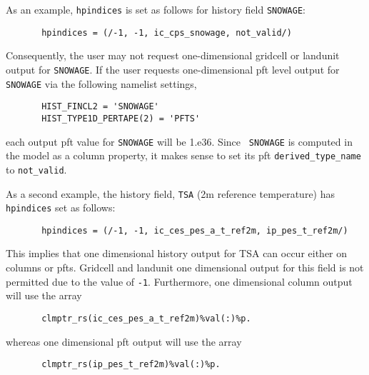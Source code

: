 As an example, {\tt hpindices} is set as follows for history field
{\tt SNOWAGE}:
\begin{verbatim}
       hpindices = (/-1, -1, ic_cps_snowage, not_valid/)
\end{verbatim}
Consequently, the user may not request one-dimensional gridcell or
landunit output for {\tt SNOWAGE}.  If the user requests
one-dimensional pft level output for {\tt SNOWAGE} via the following
namelist settings,
\begin{verbatim}
       HIST_FINCL2 = 'SNOWAGE' 
       HIST_TYPE1D_PERTAPE(2) = 'PFTS' 
\end{verbatim}
each output pft value for {\tt SNOWAGE} will be 1.e36. Since {\tt
SNOWAGE} is computed in the model as a column property, it makes sense
to set its pft {\tt derived\_type\_name} to {\tt not\_valid}.

As a second example, the history field, {\tt TSA} (2m reference
temperature) has {\tt hpindices} set as follows:
\begin{verbatim}
       hpindices = (/-1, -1, ic_ces_pes_a_t_ref2m, ip_pes_t_ref2m/)
\end{verbatim}
This implies that one dimensional history output for TSA can occur
either on columns or pfts.  Gridcell and landunit one dimensional
output for this field is not permitted due to the value of {\tt -1}.
Furthermore, one dimensional column output will use the array
\begin{verbatim}
       clmptr_rs(ic_ces_pes_a_t_ref2m)%val(:)%p.
\end{verbatim}
whereas one dimensional pft output will use the array
\begin{verbatim}
       clmptr_rs(ip_pes_t_ref2m)%val(:)%p.
\end{verbatim}

